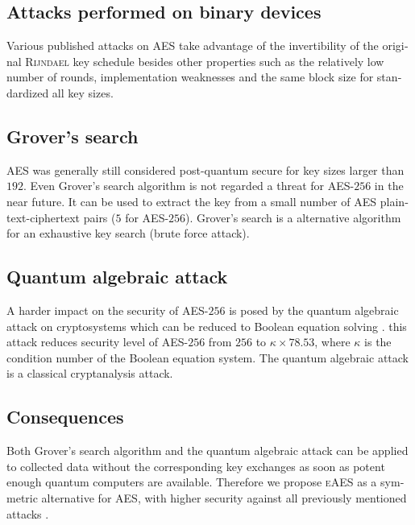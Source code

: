 \documentclass[a4paper,11pt]{article}
\begin{document}
\begin{otherlanguage}{english}
\subsection{Attacks performed on binary devices}
\noindent
Various published attacks on \textsc{AES} \cite{HFE, WEI, CRK} take advantage of the invertibility of the original \textsc{Rijndael} key schedule besides other properties such as the relatively low number of rounds, implementation weaknesses and the same block size for standardized all key sizes.

\subsection{Grover's search}
\noindent
\textsc{AES} was generally still considered post-quantum secure for key sizes larger than $192$. Even Grover’s search algorithm \cite{GRV} is not regarded a threat for \textsc{AES}-$256$ in the near future. It can be used to extract the key from a small number of \textsc{AES} plaintext-ciphertext pairs ($5$ for \textsc{AES}-$256$). Grover's search is a alternative algorithm for an exhaustive key search (brute force attack).

\subsection{Quantum algebraic attack}
\noindent
A harder impact on the security of \textsc{AES}-$256$ is posed by the quantum algebraic attack on cryptosystems which can be reduced to Boolean equation solving \cite{QAA}. this attack reduces security level of \textsc{AES}-$256$ from $256$ to $\kappa \times 78.53$, where $\kappa$ is the condition number of the Boolean equation system. The quantum algebraic attack is a classical cryptanalysis attack.

\subsection{Consequences}
\noindent
Both Grover's search algorithm and the quantum algebraic attack can be applied to collected data without the corresponding key exchanges as soon as potent enough quantum computers are available. Therefore we propose \textsc{eAES} as a symmetric alternative for \textsc{AES}, with higher security against all previously mentioned attacks \cite{HFE,WEI,CRK,GRO,QAA}.\\



\end{otherlanguage}
\end{document}
